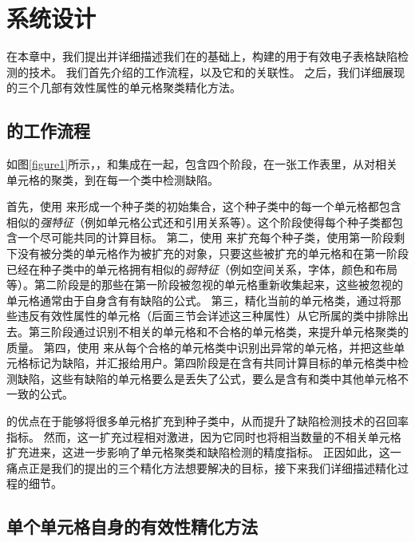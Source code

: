 \chapter{系统设计}

在本章中，我们提出并详细描述我们在\cu 的基础上，构建的用于有效电子表格缺陷检测的技术\wa 。
我们首先介绍\wa 的工作流程，以及它和\cu 的关联性。
之后，我们详细展现\wa 的三个几部有效性属性的单元格聚类精化方法。

\section{\wa 的工作流程}



如图\ref{figure1}所示，\wa ，和\cu 集成在一起，包含四个阶段，在一张工作表里，从对相关单元格的聚类，到在每一个类中检测缺陷。

首先，\wa 使用 \cu 来形成一个种子类的初始集合，这个种子类中的每一个单元格都包含相似的\textit{强特征}（例如单元格公式还和引用关系等）。这个阶段使得每个种子类都包含一个尽可能共同的计算目标。
第二，\wa 使用 \cu 来扩充每个种子类，使用第一阶段剩下没有被分类的单元格作为被扩充的对象，只要这些被扩充的单元格和在第一阶段已经在种子类中的单元格拥有相似的\textit{弱特征}（例如空间关系，字体，颜色和布局等）。第二阶段是的那些在第一阶段被忽视的单元格重新收集起来，这些被忽视的单元格通常由于自身含有有缺陷的公式。
第三，\wa 精化当前的单元格类，通过将那些违反有效性属性的单元格（后面三节会详述这三种属性）从它所属的类中排除出去。第三阶段通过识别不相关的单元格和不合格的单元格类，来提升单元格聚类的质量。
第四，\wa 使用 \cu 来从每个合格的单元格类中识别出异常的单元格，并把这些单元格标记为缺陷，并汇报给用户。第四阶段是在含有共同计算目标的单元格类中检测缺陷，这些有缺陷的单元格要么是丢失了公式，要么是含有和类中其他单元格不一致的公式。

\cu 的优点在于能够将很多单元格扩充到种子类中，从而提升了缺陷检测技术的召回率指标\cite{cheung2016custodes}。
然而，这一扩充过程相对激进，因为它同时也将相当数量的不相关单元格扩充进来，这进一步影响了单元格聚类和缺陷检测的精度指标。
正因如此，这一痛点正是我们的\wa 提出的三个精化方法想要解决的目标，接下来我们详细描述精化过程的细节。

\section{单个单元格自身的有效性精化方法}



